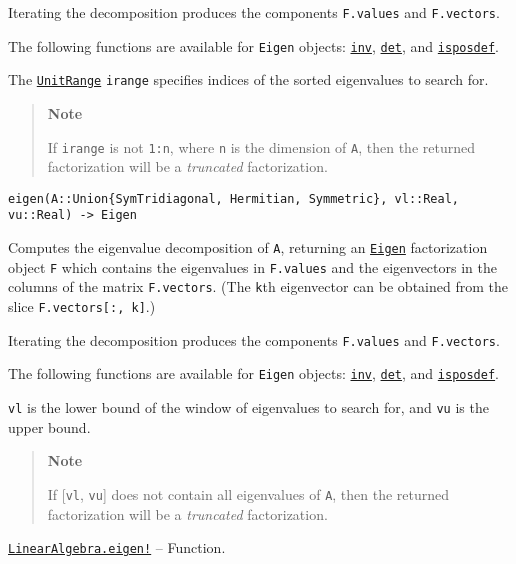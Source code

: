 \begin{adjustwidth}{2em}{0pt}
Iterating the decomposition produces the components \texttt{F.values} and \texttt{F.vectors}.

The following functions are available for \texttt{Eigen} objects: \hyperlink{13336866048543706848}{\texttt{inv}}, \hyperlink{16543378577000914469}{\texttt{det}}, and \hyperlink{13841568437070319804}{\texttt{isposdef}}.

The \hyperlink{9165955949298153694}{\texttt{UnitRange}} \texttt{irange} specifies indices of the sorted eigenvalues to search for.

\begin{quote}
\textbf{Note}

If \texttt{irange} is not \texttt{1:n}, where \texttt{n} is the dimension of \texttt{A}, then the returned factorization will be a \emph{truncated} factorization.

\end{quote}



\begin{lstlisting}
eigen(A::Union{SymTridiagonal, Hermitian, Symmetric}, vl::Real, vu::Real) -> Eigen
\end{lstlisting}

Computes the eigenvalue decomposition of \texttt{A}, returning an \hyperlink{2476442734611677039}{\texttt{Eigen}} factorization object \texttt{F} which contains the eigenvalues in \texttt{F.values} and the eigenvectors in the columns of the matrix \texttt{F.vectors}. (The \texttt{k}th eigenvector can be obtained from the slice \texttt{F.vectors[:, k]}.)

Iterating the decomposition produces the components \texttt{F.values} and \texttt{F.vectors}.

The following functions are available for \texttt{Eigen} objects: \hyperlink{13336866048543706848}{\texttt{inv}}, \hyperlink{16543378577000914469}{\texttt{det}}, and \hyperlink{13841568437070319804}{\texttt{isposdef}}.

\texttt{vl} is the lower bound of the window of eigenvalues to search for, and \texttt{vu} is the upper bound.

\begin{quote}
\textbf{Note}

If [\texttt{vl}, \texttt{vu}] does not contain all eigenvalues of \texttt{A}, then the returned factorization will be a \emph{truncated} factorization.

\end{quote}


\end{adjustwidth}
\hypertarget{11207008815152064958}{}
\hyperlink{11207008815152064958}{\texttt{LinearAlgebra.eigen!}}  -- {Function.}

